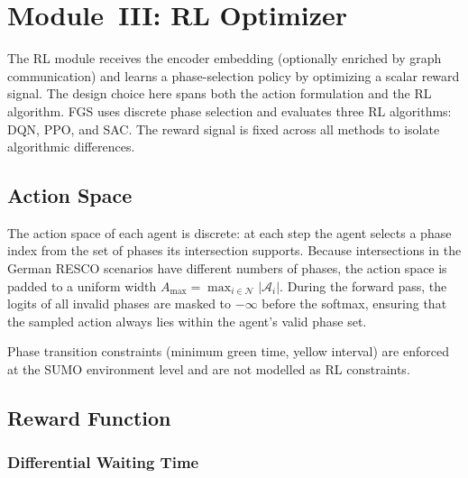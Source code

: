 \section{Module~III: RL Optimizer}
\label{sec:Methodology_RLModule}

The RL module receives the encoder embedding (optionally enriched by graph communication) and learns a phase-selection policy by optimizing a scalar reward signal. The design choice here spans both the action formulation and the RL algorithm. FGS uses discrete phase selection and evaluates three RL algorithms: DQN, PPO, and SAC. The reward signal is fixed across all methods to isolate algorithmic differences.

\subsection{Action Space}
\label{sec:Methodology_ActionSpace}

The action space of each agent is discrete: at each step the agent selects a phase index from the set of phases its intersection supports. Because intersections in the German RESCO scenarios have different numbers of phases, the action space is padded to a uniform width $A_{\max} = \max_{i \in \mathcal{N}} |\mathcal{A}_i|$. During the forward pass, the logits of all invalid phases are masked to $-\infty$ before the softmax, ensuring that the sampled action always lies within the agent's valid phase set.

Phase transition constraints (minimum green time, yellow interval) are enforced at the SUMO environment level and are not modelled as RL constraints.

\subsection{Reward Function}
\label{sec:Methodology_Rewards}

\subsubsection{Differential Waiting Time}
\label{sec:Methodology_DiffWaitingTime}


